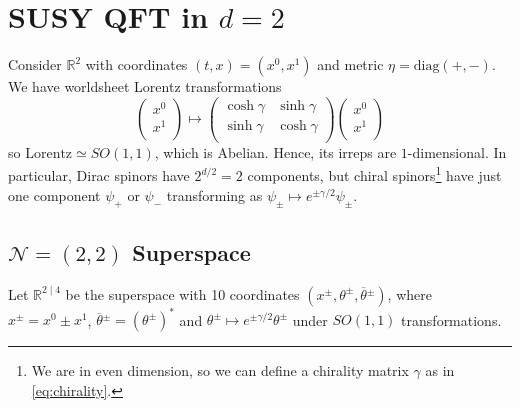 
\chapter{SUSY QFT in \texorpdfstring{$d = 2$}{Two Dimensions}}%
\label{cha:susy_qft_in_two_dimensions}

Consider $\mathbb{R}^2$ with coordinates $(t, x) = (x^0, x^1)$ and metric $\eta = \text{diag}(+, -)$.
We have worldsheet Lorentz transformations
\begin{equation}
  \begin{pmatrix}
  x^0 \\
  x^1 \\
  \end{pmatrix} \mapsto
  \begin{pmatrix}
   \cosh\gamma & \sinh \gamma \\
   \sinh \gamma & \cosh \gamma \\
  \end{pmatrix}
  \begin{pmatrix}
  x^0 \\
  x^1 \\
  \end{pmatrix}
\end{equation}
so $\text{Lorentz} \simeq SO(1, 1)$, which is Abelian.
Hence, its irreps are $1$-dimensional. In particular, Dirac spinors have $2^{d / 2} = 2$ components, but chiral spinors\footnote{We are in even dimension, so we can define a chirality matrix $\gamma$ as in \eqref{eq:chirality}.} have just one component $\psi_+$ or $\psi_-$ transforming as $\psi_{\pm} \mapsto e^{\pm \gamma / 2} \psi_{\pm}$.

\section{\texorpdfstring{$\mathcal{N} = (2, 2)$}{2, 2} Superspace}%
\label{sec:2_2_superspace}

Let $\mathbb{R}^{2 \mid 4}$ be the superspace with 10 coordinates $(x^{\pm}, \theta^{\pm}, \overline{\theta}{}^{\pm})$, where $x^{\pm} =  x^0 \pm x^1$, $\overline{\theta}{}^{\pm} = (\theta^{\pm})^*$ and $\theta^{\pm} \mapsto e^{\pm \gamma / 2} \theta^{\pm}$ under $SO(1, 1)$ transformations.

